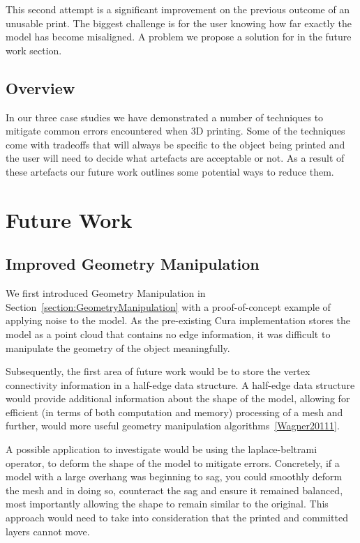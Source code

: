 \documentclass[11pt]{report} %
\begin{document}
This second attempt is a significant improvement on the previous outcome of an unusable print. The biggest challenge is for the user knowing how far exactly the model has become misaligned. A problem we propose a solution for in the future work section.   


\section{Overview}
In our three case studies we have demonstrated a number of techniques to mitigate common errors encountered when 3D printing.  Some of the techniques come with tradeoffs that will always be specific to the object being printed and the user will need to decide what artefacts are acceptable or not. As a result of these artefacts our future work outlines some potential ways to reduce them.  




\chapter{Future Work}
\section{Improved Geometry Manipulation}
We first introduced Geometry Manipulation in Section~\ref{section:GeometryManipulation} with a proof-of-concept example of applying noise to the model. As the pre-existing Cura implementation stores the model as a point cloud that contains no edge information, it was difficult to manipulate the geometry of the object meaningfully. 

Subsequently, the first area of future work would be to store the vertex connectivity information in a half-edge data structure. A half-edge data structure would provide additional information about the shape of the model, allowing for efficient (in terms of both computation and memory) processing of a mesh and further, would more useful geometry manipulation algorithms~\ref{Wagner20111}.

A possible application to investigate would be using the laplace-beltrami operator, to deform the shape of the model to mitigate errors. Concretely, if a model with a large overhang was beginning to sag, you could smoothly deform the mesh and in doing so, counteract the sag and ensure it remained balanced, most importantly allowing the shape to remain similar to the original. This approach would need to take into consideration that the printed and committed layers cannot move. 
\end{document}
